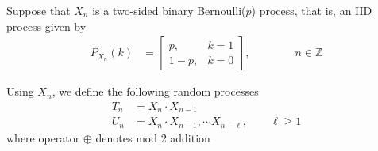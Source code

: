 \ifspanish

\else

Suppose that $X_n$ is a two-sided binary Bernoulli($p$) process, that is, an IID process given by
\begin{align*}
P_{X_n}(k) 
	&= \left[\begin{array}{ll}
             p,   &  k=1   \\
             1-p, &  k=0
          \end{array} \right]   %
,   \qquad\qquad n\in \mathbb{Z}
\end{align*}

Using $X_n$, we define the following random processes
\begin{align*}
T_n &= X_n \cdot X_{n-1}      \\
U_n &= X_n \cdot X_{n-1}, \cdots X_{n-\ell},    \qquad \ell \ge 1
\end{align*}
where operator $\oplus$ denotes mod 2 addition


